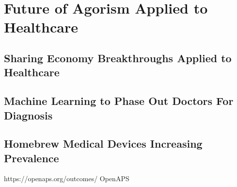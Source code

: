 \documentclass{article}
\begin{document}
\section{Future of Agorism Applied to Healthcare}

\subsection{Sharing Economy Breakthroughs Applied to Healthcare}


\subsection{Machine Learning to Phase Out Doctors For Diagnosis}

\cite{topol2015patient}

\subsection{Homebrew Medical Devices Increasing Prevalence}


\cite{carson2010homebrew}



\cite{lausted2004posam}




https://openaps.org/outcomes/
OpenAPS
\cite{lewis2015introducing}





\cite{OpenSourceHealthcare}
\cite{carsonopensource}
\cite{MarketsNotCapitalism}
\cite{carsonhealthcare}



\end{document}
